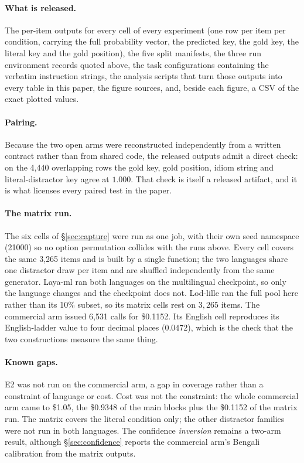 \documentclass[11pt]{article}
\begin{document}
\paragraph{What is released.} The per-item outputs for every cell of every
experiment (one row per item per condition, carrying the full probability
vector, the predicted key, the gold key, the literal key and the gold position),
the five split manifests, the three run environment records quoted above, the
task configurations containing the verbatim instruction strings, the analysis
scripts that turn those outputs into every table in this paper, the figure
sources, and, beside each figure, a CSV of the exact plotted values.

\paragraph{Pairing.} Because the two open arms were reconstructed independently
from a written contract rather than from shared code, the released outputs admit
a direct check: on the 4{,}440 overlapping rows the gold key, gold position,
idiom string and literal-distractor key agree at $1.000$. That check is itself a
released artifact, and it is what licenses every paired test in the paper.

\paragraph{The matrix run.} The six cells of \S\ref{sec:capture} were run as one
job, with their own seed namespace (21000) so no option permutation collides with
the runs above. Every cell covers the same 3{,}265
items and is built by a single function; the two languages share one distractor
draw per item and are shuffled independently from the same generator. Laya-ml
ran both languages on the multilingual checkpoint, so only the language changes
and the checkpoint does not. Lod-lille ran the full pool here rather than its
10\% subset, so its matrix cells rest on $3{,}265$ items. The
commercial arm issued 6{,}531 calls for \$0.1152. Its English cell reproduces
its English-ladder value to four decimal places ($0.0472$), which is the check
that the two constructions measure the same thing.

\paragraph{Known gaps.} E2 was not run on the commercial arm, a gap in coverage
rather than a constraint of language or cost. Cost was not the constraint: the whole commercial arm came to
\$1.05, the \$0.9348 of the main blocks plus the \$0.1152 of the matrix run. The matrix covers the literal condition only; the other distractor
families were not run in both languages. The confidence \emph{inversion} remains a
two-arm result, although \S\ref{sec:confidence} reports the commercial arm's
Bengali calibration from the matrix outputs.
\end{document}
